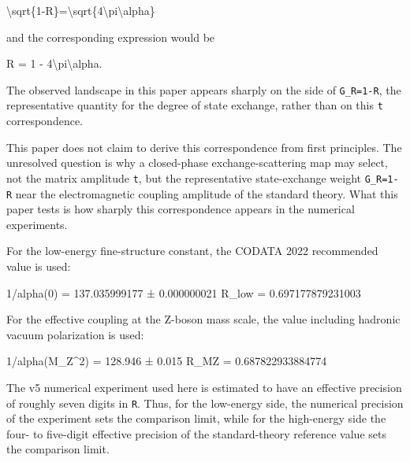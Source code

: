 \documentclass[
]{article}
\newenvironment{Shaded}{}{}
\newcommand{\NormalTok}[1]{#1}
\begin{document}
\begin{Shaded}
\begin{Highlighting}[]
\NormalTok{\textbackslash{}sqrt\{1{-}R\}=\textbackslash{}sqrt\{4\textbackslash{}pi\textbackslash{}alpha\}}
\end{Highlighting}
\end{Shaded}

and the corresponding expression would be

\begin{Shaded}
\begin{Highlighting}[]
\NormalTok{R = 1 {-} 4\textbackslash{}pi\textbackslash{}alpha.}
\end{Highlighting}
\end{Shaded}

The observed landscape in this paper appears sharply on the side of
\texttt{G\_R=1-R}, the representative quantity for the degree of state
exchange, rather than on this \texttt{\textbar{}t\textbar{}}
correspondence.

This paper does not claim to derive this correspondence from first
principles. The unresolved question is why a closed-phase
exchange-scattering map may select, not the matrix amplitude
\texttt{\textbar{}t\textbar{}}, but the representative state-exchange
weight \texttt{G\_R=1-R} near the electromagnetic coupling amplitude of
the standard theory. What this paper tests is how sharply this
correspondence appears in the numerical experiments.

For the low-energy fine-structure constant, the CODATA 2022 recommended
value is used:

\begin{Shaded}
\begin{Highlighting}[]
\NormalTok{1/alpha(0) = 137.035999177 ± 0.000000021}
\NormalTok{R\_low      = 0.697177879231003}
\end{Highlighting}
\end{Shaded}

For the effective coupling at the Z-boson mass scale, the value
including hadronic vacuum polarization is used:

\begin{Shaded}
\begin{Highlighting}[]
\NormalTok{1/alpha(M\_Z\^{}2) = 128.946 ± 0.015}
\NormalTok{R\_MZ           = 0.687822933884774}
\end{Highlighting}
\end{Shaded}

The v5 numerical experiment used here is estimated to have an effective
precision of roughly seven digits in \texttt{R}. Thus, for the
low-energy side, the numerical precision of the experiment sets the
comparison limit, while for the high-energy side the four- to five-digit
effective precision of the standard-theory reference value sets the
comparison limit.
\end{document}
